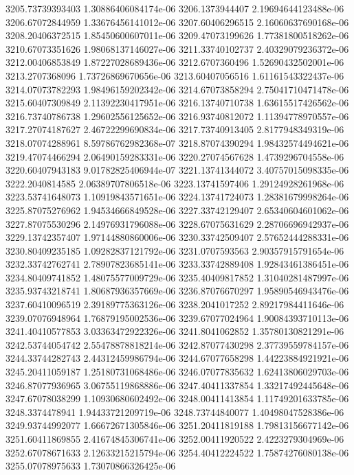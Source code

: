 {3205.73739393403 1.30886406084174e-06
3206.1373944407 2.19694644123488e-06
3206.67072844959 1.33676456141012e-06
3207.60406296515 2.16060637690168e-06
3208.20406372515 1.85450600607011e-06
3209.47073199626 1.77381800518262e-06
3210.67073351626 1.98068137146027e-06
3211.33740102737 2.40329079236372e-06
3212.00406853849 1.87227028689436e-06
3212.6707360496 1.52690432502001e-06
3213.2707368096 1.73726869670656e-06
3213.60407056516 1.61161543322437e-06
3214.07073782293 1.98496159202342e-06
3214.67073858294 2.75041710471478e-06
3215.60407309849 2.11392230417951e-06
3216.13740710738 1.63615517426562e-06
3216.73740786738 1.29602556125652e-06
3216.93740812072 1.11394778970557e-06
3217.27074187627 2.46722299690834e-06
3217.73740913405 2.8177948349319e-06
3218.07074288961 8.59786762982368e-07
3218.87074390294 1.98432574494621e-06
3219.47074466294 2.06490159283331e-06
3220.27074567628 1.4739296704558e-06
3220.60407943183 9.01782825406944e-07
3221.13741344072 3.40757015098335e-06
3222.2040814585 2.06389707806518e-06
3223.13741597406 1.29124928261968e-06
3223.53741648073 1.10919843571651e-06
3224.13741724073 1.28381679998264e-06
3225.87075276962 1.94534666849528e-06
3227.33742129407 2.65340604601062e-06
3227.87075530296 2.14976931796088e-06
3228.67075631629 2.28706696942937e-06
3229.13742357407 1.97144880860006e-06
3230.33742509407 2.57652444288331e-06
3230.80409235185 1.09282837121792e-06
3231.0707593563 2.90357915791654e-06
3232.33742762741 2.78907823685141e-06
3233.33742889408 1.92843461386451e-06
3234.80409741852 1.48075577009729e-06
3235.40409817852 1.31040281487997e-06
3235.93743218741 1.80687936357669e-06
3236.87076670297 1.95890546943476e-06
3237.60410096519 2.39189775363126e-06
3238.2041017252 2.89217984411646e-06
3239.07076948964 1.76879195002536e-06
3239.67077024964 1.90084393710113e-06
3241.40410577853 3.03363472922326e-06
3241.8041062852 1.35780130821291e-06
3242.53744054742 2.55478878818214e-06
3242.87077430298 2.37739559784157e-06
3244.33744282743 2.44312459986794e-06
3244.67077658298 1.44223884921921e-06
3245.20411059187 1.25180731068486e-06
3246.07077835632 1.62413806029703e-06
3246.87077936965 3.06755119868886e-06
3247.40411337854 1.33217492445648e-06
3247.67078038299 1.10930680602492e-06
3248.00411413854 1.11749201633785e-06
3248.3374478941 1.94433721209719e-06
3248.73744840077 1.40498047528386e-06
3249.93744992077 1.66672671305846e-06
3251.20411819188 1.79813156677142e-06
3251.60411869855 2.41674845306741e-06
3252.00411920522 2.4223279304969e-06
3252.67078671633 2.12633215215794e-06
3254.40412224522 1.75874276080138e-06
3255.07078975633 1.73070866326425e-06
}
